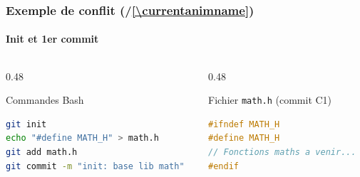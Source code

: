 \documentclass[
	11pt,
	aspectratio=169
]{beamer}
\newcounter{animstep}
\newcommand{\stepanim}{%
    \stepcounter{animstep}%
    (\theanimstep/\ref*{\currentanimname})%
}
\begin{document}
\begin{frame}[fragile]
    \frametitle{Exemple de conflit \stepanim}
    \framesubtitle{Init et 1er commit}

    \begin{center}
    \end{center}
    \vspace{-0.3cm}

    \begin{columns}[t]
        \begin{column}{0.48\textwidth}
            \begin{block}{\scriptsize Commandes Bash}
\begin{lstlisting}[language=bash]
git init
echo "#define MATH_H" > math.h
git add math.h
git commit -m "init: base lib math"
\end{lstlisting}
            \end{block}
        \end{column}
        \begin{column}{0.48\textwidth}
            \begin{exampleblock}{\scriptsize Fichier \texttt{math.h} (commit C1)}
\begin{lstlisting}[language=C]
#ifndef MATH_H
#define MATH_H
// Fonctions maths a venir...
#endif
\end{lstlisting}
            \end{exampleblock}
        \end{column}
    \end{columns}
\end{frame}
\end{document}
